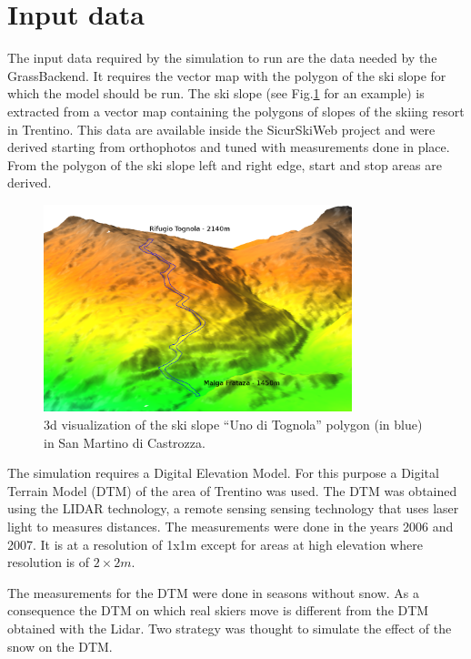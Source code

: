 \documentclass[12pt,a4paper,twoside]{book}
\begin{document}
\section{Input data}
The input data required by the simulation to run are the data needed by the GrassBackend. It requires the vector map with the polygon of the ski slope for which the model should be run. The ski slope (see Fig.\ref{uno_tognola_3d} for an example) is extracted from a vector map containing the polygons of slopes of the skiing resort in Trentino. This data are available inside the SicurSkiWeb project and were derived starting from orthophotos and tuned with measurements done in place. From the polygon of the ski slope left and right edge, start and stop areas are derived.

\begin{figure}
  \begin{center}
    \includegraphics[width=0.8\textwidth]{images/uno_tognola_3d.eps}
    \caption{3d visualization of the ski slope ``Uno di Tognola'' polygon (in blue) in San Martino di Castrozza.}\label{uno_tognola_3d}
  \end{center}
\end{figure}

The simulation requires a Digital Elevation Model. For this purpose a Digital Terrain Model (DTM) of the area of Trentino was used. The DTM was obtained using the LIDAR technology, a remote sensing sensing technology that uses laser light to measures distances. The measurements were done in the years 2006 and 2007. It is at a resolution of 1x1m except for areas at high elevation where resolution is of $2\times 2m$.

The measurements for the DTM were done in seasons without snow. As a consequence the DTM on which real skiers move is different from the DTM obtained with the Lidar. Two strategy was thought to simulate the effect of the snow on the DTM.
\end{document}
